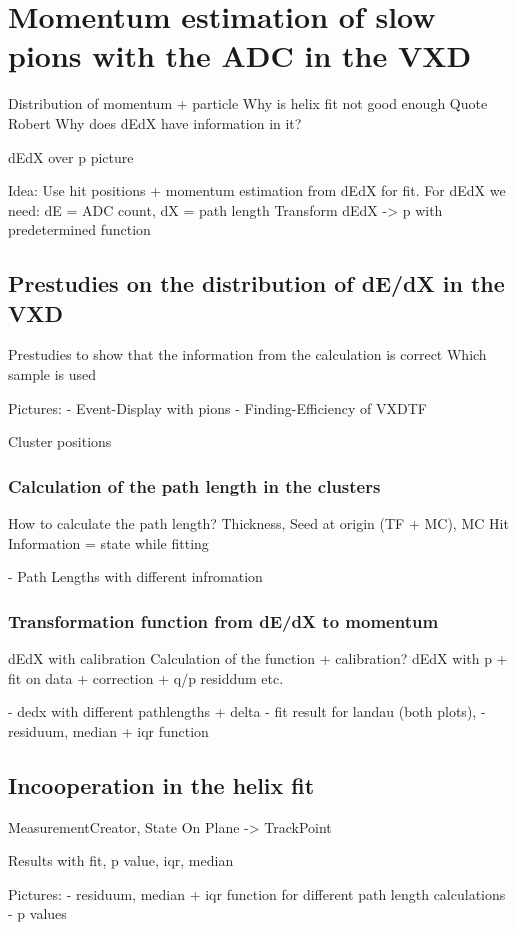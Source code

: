 \chapter{Momentum estimation of slow pions with the ADC in the VXD}

Distribution of momentum + particle
Why is helix fit not good enough
Quote Robert
Why does dEdX have information in it?

dEdX over p picture

Idea: Use hit positions + momentum estimation from dEdX for fit.
For dEdX we need: dE = ADC count, dX = path length
Transform dEdX -> p with predetermined function

\section{Prestudies on the distribution of dE/dX in the VXD}



Prestudies to show that the information from the calculation is correct
Which sample is used


Pictures:
- Event-Display with pions
- Finding-Efficiency of VXDTF

Cluster positions

\subsection{Calculation of the path length in the clusters}
How to calculate the path length?
Thickness, Seed at origin (TF + MC), MC Hit Information = state while fitting

- Path Lengths with different infromation

\subsection{Transformation function from dE/dX to momentum}

dEdX with calibration
Calculation of the function + calibration?
dEdX with p + fit on data + correction + q/p residdum etc.

- dedx with different pathlengths + delta
- fit result for landau (both plots),
- residuum, median + iqr function

\section{Incooperation in the helix fit}

MeasurementCreator, State On Plane -> TrackPoint

Results with fit, p value, iqr, median

Pictures:
- residuum, median + iqr function for different path length calculations
- p values